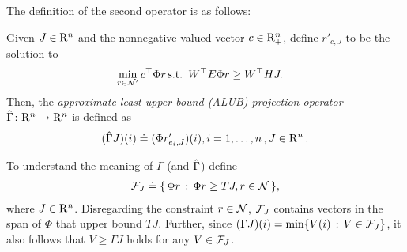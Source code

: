 The definition of the second operator is as follows:
\begin{definition}\label{alubpop}
Given $J\in \mathrm{R}^n$ and the nonnegative valued vector $c\in \mathrm{R}^n_+$, define $r'_{c,J}$ to be the solution to
\begin{align}\label{alubplp}
\underset{r\in \N'}{\min}& \,\mb c^\top \Phi r\,\mb
\text{s.t.} \,\,\, W^\top E \Phi r\geq W^\top HJ.
\end{align}
Then, the \emph{approximate least upper bound (ALUB) projection operator}
$\hat{\Gamma} \colon \mathrm{R}^n \rightarrow \mathrm{R}^n$ is defined as
\begin{align}\label{tgamdef}
(\hg J)(i)\eqdef(\Phi r'_{e_i,J})(i), \mb i=1,\ldots,n\,, J\in \R^n\,.
\end{align}
\end{definition}
\begin{remark}\label{ubrem}
To understand the meaning of $\Gamma$ (and $\hat{\Gamma}$) define
\begin{align}\label{ubclass}
\F_J\eqdef\{\,\Phi r\,:\,\Phi r\geq TJ, r\in \N\,\},
\end{align}
where $J\in \mathrm{R}^n$.
Disregarding the constraint $r\in \mathcal{N}$,
$\mathcal{F}_J$ contains vectors in the span of $\Phi$ that upper bound $TJ$. Further, since $(\Gamma J)(i) = \min\{ V(i) \,:\, V\in \mathcal{F}_J \}$, it also follows that $ V\ge \Gamma J $ holds for any $V\in \mathcal{F}_J$.
\end{remark}

%
